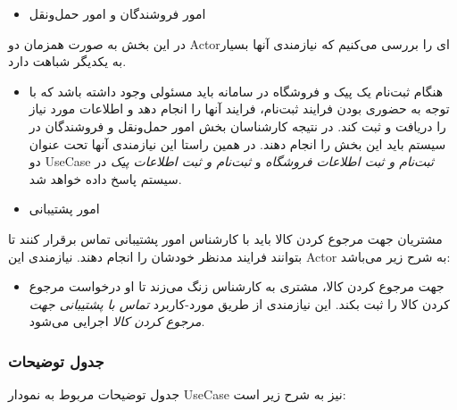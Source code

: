 \documentclass[]{article}
\begin{document}
\begin{itemize}
\item
  امور فروشندگان و امور حمل‌ونقل
\end{itemize}

در این بخش به صورت همزمان دو Actorای را بررسی می‌کنیم که نیازمندی آنها
بسیار به یکدیگر شباهت دارد.

\begin{itemize}
\item
  هنگام ثبت‌نام یک پیک و فروشگاه در سامانه باید مسئولی وجود داشته باشد
  که با توجه به حضوری بودن فرایند ثبت‌نام، فرایند آنها را انجام دهد و
  اطلاعات مورد نیاز را دریافت و ثبت کند. در نتیجه کارشناسان بخش امور
  حمل‌ونقل و فروشندگان در سیستم باید این بخش را انجام دهند. در همین
  راستا این نیازمندی آنها تحت عنوان دو UseCase \emph{ثبت‌نام و ثبت
  اطلاعات فروشگاه} و \emph{ثبت‌نام و ثبت اطلاعات پیک} در سیستم پاسخ داده
  خواهد شد.
\end{itemize}

\begin{itemize}
\item
  امور پشتیبانی
\end{itemize}

مشتریان جهت مرجوع کردن کالا باید با کارشناس امور پشتیبانی تماس برقرار
کنند تا بتوانند فرایند مدنظر خودشان را انجام دهند. نیازمندی این Actor به
شرح زیر می‌باشد:

\begin{itemize}
\item
  جهت مرجوع کردن کالا، مشتری به کارشناس زنگ می‌زند تا او درخواست مرجوع
  کردن کالا را ثبت بکند. این نیازمندی از طریق مورد-کاربرد \emph{تماس با
  پشتیبانی جهت مرجوع کردن کالا} اجرایی می‌شود.
\end{itemize}

\subsubsection{جدول
توضیحات}\label{ux62cux62fux648ux644-ux62aux648ux636ux6ccux62dux627ux62a}

جدول توضیحات مربوط به نمودار UseCase نیز به شرح زیر است:
\end{document}
